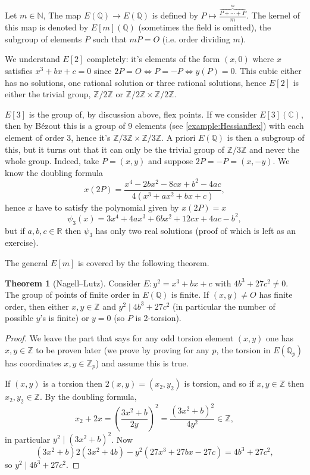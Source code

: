 \documentclass{article}
\newcommand{\N}{\mathbb{N}}
\newcommand{\Z}{\mathbb{Z}}
\newcommand{\Q}{\mathbb{Q}}
\newcommand{\R}{\mathbb{R}}
\newcommand{\C}{\mathbb{C}}
\theoremstyle{definition}
\newtheorem{thm}[defn]{Theorem}
\begin{document}
Let $m\in\N$, The map $E(\Q)\rightarrow E(\Q)$ is defined by $P\mapsto \frac{\overbrace{P+\cdots+P}^m}{m}$. The kernel of this map is denoted by $E[m](\Q)$ (sometimes the field is omitted), the subgroup of elements $P$ such that $mP=O$ (i.e. order dividing $m$).

We understand $E[2]$ completely: it's elements of the form $(x,0)$ where $x$ satisfies $x^3+bx+c=0$ since $2P=O\iff P=-P\iff y(P)=0$. This cubic either has no solutions, one rational solution or three rational solutions, hence $E[2]$ is either the trivial group, $\Z/2\Z$ or $\Z/2\Z\times\Z/2\Z$.

$E[3]$ is the group of, by discussion above, flex points. If we consider $E[3](\C)$, then by Bézout this is a group of 9 elements (see \ref{example:Hessianflex}) with each element of order 3, hence it's $\Z/3\Z\times\Z/3\Z$. A priori $E(\Q)$ is then a subgroup of this, but it turns out that it can only be the trivial group of $\Z/3\Z$ and never the whole group. Indeed, take $P=(x,y)$ and suppose $2P=-P=(x,-y)$. We know the doubling formula
\[
x(2P)=\frac{x^4-2bx^2-8cx+b^2-4ac}{4(x^3+ax^2+bx+c)},
\]
hence $x$ have to satisfy the polynomial given by $x(2P)=x$
\[
\psi_3(x)=3x^4+4ax^3+6bx^2+12cx+4ac-b^2,
\]
but if $a,b,c\in\R$ then $\psi_3$ has only two real solutions (proof of which is left as an exercise).

The general $E[m]$ is covered by the following theorem.

\begin{thm}[Nagell--Lutz]
Consider $E:y^2=x^3+bx+c$ with $4b^3+27c^2\neq 0$. The group of points of finite order in $E(\Q)$ is finite. If $(x,y)\neq O$ has finite order, then either $x,y\in\Z$ and $y^2\mid 4b^3+27c^2$ (in particular the number of possible $y$'s is finite) or $y=0$ (so $P$ is 2-torsion).
\end{thm}
\begin{proof}
We leave the part that says for any odd torsion element $(x,y)$ one has $x,y\in\Z$ to be proven later (we prove by proving for any $p$, the torsion in $E(\Q_p)$ has coordinates $x,y\in\Z_p$) and assume this is true.

If $(x,y)$ is a torsion then $2(x,y)=(x_2,y_2)$ is torsion, and so if $x,y\in\Z$ then $x_2,y_2\in\Z$. By the doubling formula,
\[
x_2+2x=\left(\frac{3x^2+b}{2y}\right)^2=\frac{(3x^2+b)^2}{4y^2}\in\Z,
\]
in particular $y^2\mid (3x^2+b)^2$. Now
\[
(3x^2+b)2(3x^2+4b)-y^2(27x^3+27bx-27c)=4b^3+27c^2,
\]
so $y^2\mid 4b^3+27c^2$.
\end{proof}
\end{document}
